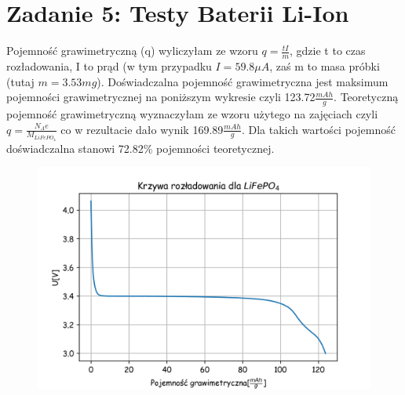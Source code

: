 \documentclass[a4paper,10pt]{article}
\begin{document}
\section{Zadanie 5: Testy Baterii Li-Ion}
Pojemność grawimetryczną (q) wyliczyłam ze wzoru $q=\frac{tI} {m} $, gdzie t to czas rozładowania, I to prąd (w tym przypadku $I=59.8\mu A$, zaś m to masa próbki (tutaj $m=3.53mg$). Doświadczalna pojemność grawimetryczna jest maksimum pojemności grawimetrycznej na poniższym wykresie czyli 123.72$\frac{mAh}{g}$.
Teoretyczną pojemność grawimetryczną wyznaczyłam ze wzoru użytego na zajęciach czyli $q = \frac{N_A e}{M_{LiFePO_4}}$ co w rezultacie dało wynik 169.89$\frac{mAh}{g}$. Dla takich wartości pojemność doświadczalna stanowi 72.82\% pojemności teoretycznej.

 \begin{figure}[H]
	\centering
		\includegraphics[width=\textwidth]{../Krzywa_rozladowania.png}
\end{figure}
\end{document}
